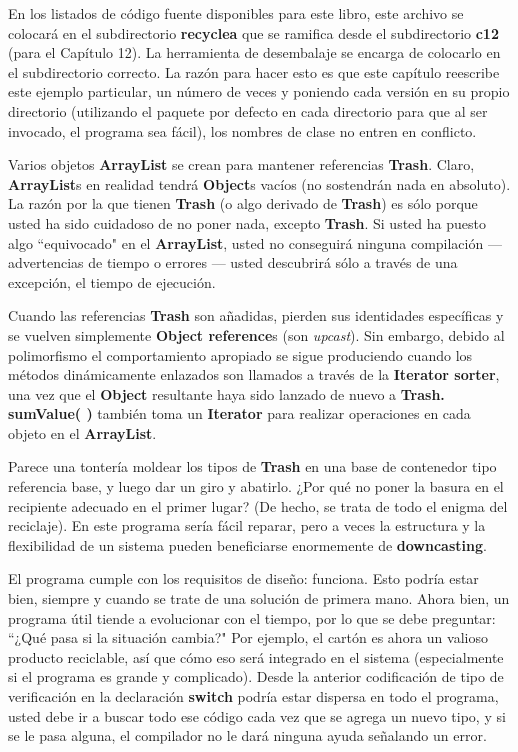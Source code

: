 En los listados de código fuente disponibles para este libro, este archivo se colocará en el subdirectorio \textbf{recyclea} que se ramifica desde el subdirectorio \textbf{c12} (para el Capítulo 12). La herramienta de desembalaje se encarga de colocarlo en el subdirectorio correcto. La razón para hacer esto es que este capítulo reescribe este ejemplo particular, un número de veces y poniendo cada versión en su propio directorio (utilizando el paquete por defecto en cada directorio para que al ser invocado, el programa sea fácil), los nombres de clase no entren en conflicto.     \newline

Varios objetos \textbf{ArrayList} se crean para mantener referencias \textbf{Trash}. Claro, \textbf{ArrayList}s en realidad tendrá \textbf{Object}s vacíos (no sostendrán nada en absoluto). La razón por la que tienen \textbf{Trash} (o algo derivado de \textbf{Trash}) es sólo porque usted ha sido cuidadoso de no poner nada, excepto \textbf{Trash}. Si usted ha puesto algo “equivocado" en el \textbf{ArrayList}, usted no conseguirá ninguna compilación — advertencias de tiempo o errores — usted descubrirá sólo a través de una excepción, el tiempo de ejecución.   \newline

Cuando las referencias \textbf{Trash} son añadidas, pierden sus identidades específicas y se vuelven simplemente \textbf{Object reference}s (son \textit{upcast}). Sin embargo, debido al polimorfismo el comportamiento apropiado se sigue produciendo cuando los métodos dinámicamente enlazados son llamados a través de la \textbf{Iterator sorter}, una vez que el \textbf{Object} resultante haya sido lanzado de nuevo a \textbf{Trash. sumValue( )} también toma un \textbf{Iterator} para realizar operaciones en cada objeto en el \textbf{ArrayList}.   \newline

Parece una tontería moldear los tipos de \textbf{Trash} en una base de contenedor tipo referencia base, y luego dar un giro y abatirlo. ¿Por qué no poner la basura en el recipiente adecuado en el primer lugar? (De hecho, se trata de todo el enigma del reciclaje). En este programa sería fácil reparar, pero a veces la estructura y la flexibilidad de un sistema pueden beneficiarse enormemente de \textbf{downcasting}.     \newline

El programa cumple con los requisitos de diseño: funciona. Esto podría estar bien, siempre y cuando se trate de una solución de primera mano. Ahora bien, un programa útil tiende a evolucionar con el tiempo, por lo que se debe preguntar: “¿Qué pasa si la situación cambia?" Por ejemplo, el cartón es ahora un valioso producto reciclable, así que cómo eso será integrado en el sistema (especialmente si el programa es grande y complicado). Desde la anterior codificación de tipo de verificación en la declaración \textbf{switch} podría estar dispersa en todo el programa, usted debe ir a buscar todo ese código cada vez que se agrega un nuevo tipo, y si se le pasa alguna, el compilador no le dará ninguna ayuda señalando un error.  \newline

